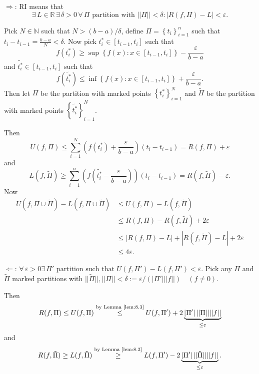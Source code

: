 \documentclass{notes}
\begin{document}
\begin{prf}
  $\Rightarrow$: RI means that 
  \[
    \exists \, L \in \mathbb R \, \exists \, \delta > 0 \, \forall \, \Pi \text{ partition with $||\Pi|| < \delta$}: \left | R(f, \Pi) - L \right | < \varepsilon.
  \]
  
  Pick $N \in \mathbb N$ such that $N > (b - a) / \delta$, define $\Pi = \left \{ t_i \right \}_{i = 1}^n$ such that $t_i - t_{i - 1} = \frac{b - a}{N} < \delta$. 
  Now pick $t^*_i \in [t_{i - 1}, t_i]$ such that 
  \[
    f(t^*_i) \geq \sup \left \{ f(x) : x \in [t_{i - 1}, t_i] \right \} - \frac{\varepsilon}{b - a}
  \]
  and $\tilde{t^*_i} \in [t_{i - 1}, t_i]$ such that 
  \[
    f(\tilde{t^*_i}) \leq \inf \left \{ f(x) : x \in [t_{i - 1}, t_i] \right \} + \frac{\varepsilon}{b - a}.
  \]
  Then let $\Pi$ be the partition with marked points $\left \{ t^*_i \right \}_{i = 1}^N$ and $\tilde \Pi$ be the partition with marked points $\left \{ \tilde{t^*_i} \right \}_{i = 1}^N$.

  Then 
  \[
    U(f, \Pi) \leq \sum_{i = 1}^N \left ( f(t^*_i) + \frac{\varepsilon}{b - a} \right ) (t_i - t_{i - 1}) = R(f, \Pi) + \varepsilon
  \]
  and 
  \[
    L(f, \tilde \Pi) \geq \sum_{i = 1}^n \left ( f(\tilde{t^*_i} - \frac{\varepsilon}{b - a}) \right ) (t_i - t_{i - 1}) = R(f, \tilde \Pi) - \varepsilon.
  \]
  Now 
  \begin{align*}
    U(f, \Pi \cup \tilde \Pi) - L(f, \Pi \cup \tilde \Pi) &\leq U(f, \Pi) - L(f, \tilde \Pi) \\ 
    &\leq R(f, \Pi) - R(f, \tilde \Pi) + 2 \varepsilon \\ 
    &\leq \left | R(f, \Pi) - L \right | + \left | R(f, \tilde \Pi) - L \right | + 2 \varepsilon \\ 
    &\leq 4 \varepsilon.
  \end{align*}
  
  $\Leftarrow$: $\forall \, \varepsilon > 0 \exists \, \Pi' \text{ partition such that } U(f, \Pi') - L(f, \Pi') < \varepsilon$.
  Pick any $\Pi$ and $\tilde \Pi$ marked partitions with $||\tilde \Pi||, ||\Pi|| < \delta := \varepsilon / (\left | \Pi' \right | ||f||) \quad (f \neq 0)$.
  
  Then 
  \[
    R(f, \Pi) \leq U(f, \Pi) \overset{\text{by Lemma~\ref{lem:8.3}}}{\leq} U(f, \Pi') + 2 \underbrace{\left | \Pi' \right | ||\Pi|| ||f||}_{\leq \varepsilon}
  \]
  and 
  \[
    R(f, \tilde \Pi) \geq L(f, \tilde \Pi) \overset{\text{by Lemma~\ref{lem:8.3}}}{\geq} L(f, \Pi') - 2 \underbrace{\left | \Pi' \right | ||\tilde \Pi|| ||f||}_{\leq \varepsilon}.
  \]
  

\end{prf}
\end{document}
